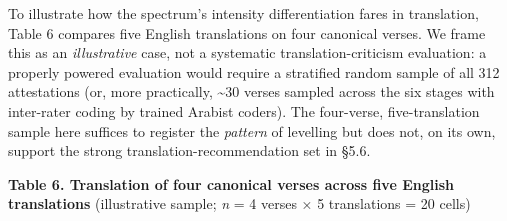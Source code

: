 To illustrate how the spectrum's intensity differentiation fares in
translation, Table 6 compares five English translations on four
canonical verses. We frame this as an \emph{illustrative} case, not a
systematic translation-criticism evaluation: a properly powered
evaluation would require a stratified random sample of all 312
attestations (or, more practically, \textasciitilde30 verses sampled
across the six stages with inter-rater coding by trained Arabist
coders). The four-verse, five-translation sample here suffices to
register the \emph{pattern} of levelling but does not, on its own,
support the strong translation-recommendation set in §5.6.

\textbf{Table 6. Translation of four canonical verses across five
English translations} (illustrative sample; \emph{n} = 4 verses × 5
translations = 20 cells)

